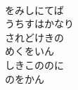 \documentclass[10pt,b5j]{tarticle} %
\begin{document}
\begin{enumerate}
\begin{minipage}[c]{\blocksize}
        \vspace{\linespace}
        \item~\\
        をみしにてば\\
        うちすはかなり\\
        されどけきの\\
        めくをいん\\
        しきこののに\\
        のをかん
    
    \end{minipage}
\end{enumerate} %
\end{document}

